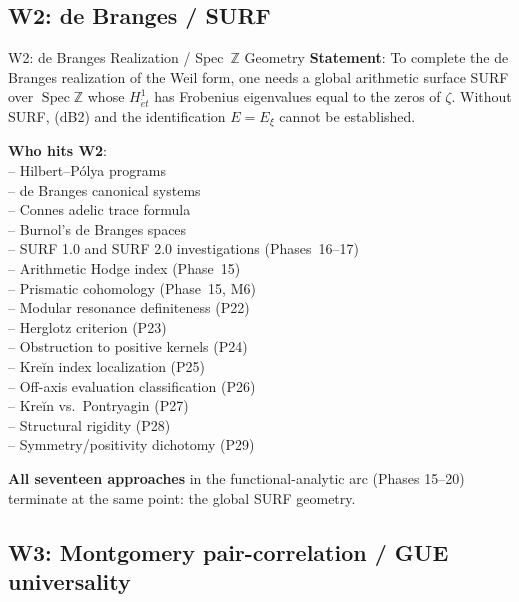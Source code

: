 \documentclass[11pt]{amsart}
\theoremstyle{definition}
\theoremstyle{remark}
\newcommand{\Spec}{\operatorname{Spec}}
\begin{document}
\subsection{W2: de Branges / SURF}

\begin{wallbox}{W2: de Branges Realization / Spec~$\mathbb{Z}$ Geometry}
\textbf{Statement}: To complete the de Branges realization of the Weil form, one needs
a global arithmetic surface SURF over $\Spec\mathbb{Z}$ whose $H^1_{\acute{e}t}$ has
Frobenius eigenvalues equal to the zeros of $\zeta$.  Without SURF, (dB2) and the
identification $E = E_\xi$ cannot be established.

\textbf{Who hits W2}: \\
-- Hilbert--Pólya programs \\
-- de Branges canonical systems \\
-- Connes adelic trace formula \\
-- Burnol's de Branges spaces \\
-- SURF 1.0 and SURF 2.0 investigations (Phases~16--17) \\
-- Arithmetic Hodge index (Phase~15) \\
-- Prismatic cohomology (Phase~15, M6) \\
-- Modular resonance definiteness (P22) \\
-- Herglotz criterion (P23) \\
-- Obstruction to positive kernels (P24) \\
-- Kreĭn index localization (P25) \\
-- Off-axis evaluation classification (P26) \\
-- Kreĭn vs.\ Pontryagin (P27) \\
-- Structural rigidity (P28) \\
-- Symmetry/positivity dichotomy (P29)

\textbf{All seventeen approaches} in the functional-analytic arc (Phases 15--20)
terminate at the same point: the global SURF geometry.
\end{wallbox}

\subsection{W3: Montgomery pair-correlation / GUE universality}
\end{document}
